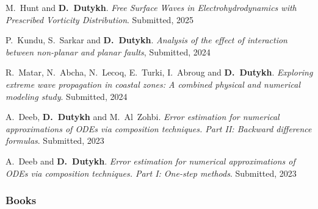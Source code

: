 \documentclass[final, a4paper, oneside, 12pt]{article}
\numberwithin{equation}{section}
\begin{document}
\begin{etaremune}
  \item M.~Hunt and \textbf{D.~Dutykh}. \textit{Free Surface Waves in Electrohydrodynamics with Prescribed Vorticity Distribution}. Submitted, 2025 %

  \item P.~Kundu, S.~Sarkar and \textbf{D.~Dutykh}. \textit{Analysis of the effect of interaction between non-planar and planar faults}, Submitted, 2024 %

  \item R.~Matar, N.~Abcha, N.~Lecoq, E.~Turki, I.~Abroug and \textbf{D.~Dutykh}. \textit{Exploring extreme wave propagation in coastal zones: A combined physical and numerical modeling study}. Submitted, 2024 %

  \item A.~Deeb, \textbf{D.~Dutykh} and M.~Al~Zohbi. \textit{Error estimation for numerical approximations of ODEs via composition techniques. Part II: Backward difference formulas}. Submitted, 2023 %

  \item A.~Deeb and \textbf{D.~Dutykh}. \textit{Error estimation for numerical approximations of ODEs via composition techniques. Part I: One-step methods}. Submitted, 2023 %

\end{etaremune}

\subsubsection{Books}
\end{document}
